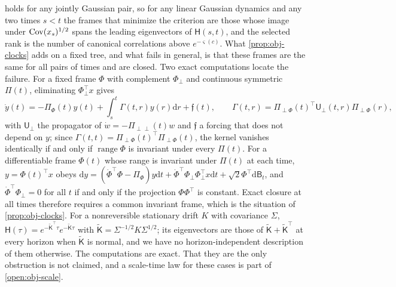 \begin{remark}\label{rem:obj-nonstationary}
 holds for any jointly Gaussian pair, so for any linear Gaussian dynamics and any two times $s<t$ the frames that minimize the criterion are those whose image under $\operatorname{Cov}(x_s)^{1/2}$ spans the leading eigenvectors of $\mathsf H(s,t)$, and the selected rank is the number of canonical correlations above $e^{-\varsigma(c)}$. What \cref{prop:obj-clocks} adds on a fixed tree, and what fails in general, is that these frames are the same for all pairs of times and are closed. Two exact computations locate the failure. For a fixed frame $\Phi$ with complement $\Phi_\perp$ and continuous symmetric $\Pi(t)$, eliminating $\Phi_\perp^\top x$ gives
\[
\dot y(t)=-\Pi_\Phi(t)y(t)+\int_s^t\Gamma(t,r)y(r)\mathrm dr+\mathfrak f(t),\qquad\Gamma(t,r)=\Pi_{\perp\Phi}(t)^\top\mathsf U_\perp(t,r)\Pi_{\perp\Phi}(r),
\]
with $\mathsf U_\perp$ the propagator of $\dot w=-\Pi_{\perp\perp}(t)w$ and $\mathfrak f$ a forcing that does not depend on $y$; since $\Gamma(t,t)=\Pi_{\perp\Phi}(t)^\top\Pi_{\perp\Phi}(t)$, the kernel vanishes identically if and only if $\operatorname{range}\Phi$ is invariant under every $\Pi(t)$. For a differentiable frame $\Phi(t)$ whose range is invariant under $\Pi(t)$ at each time, $y=\Phi(t)^\top x$ obeys $\mathrm dy=(\dot\Phi^\top\Phi-\Pi_\Phi)y\mathrm dt+\dot\Phi^\top\Phi_\perp\Phi_\perp^\top x\mathrm dt+\sqrt2\Phi^\top\mathrm d\mathsf B_t$, and $\dot\Phi^\top\Phi_\perp=0$ for all $t$ if and only if the projection $\Phi\Phi^\top$ is constant. Exact closure at all times therefore requires a common invariant frame, which is the situation of \cref{prop:obj-clocks}. For a nonreversible stationary drift $K$ with covariance $\Sigma$, $\mathsf H(\tau)=e^{-\tilde{\mathsf K}^\top\tau}e^{-\tilde{\mathsf K}\tau}$ with $\tilde{\mathsf K}=\Sigma^{-1/2}K\Sigma^{1/2}$; its eigenvectors are those of $\tilde{\mathsf K}+\tilde{\mathsf K}^\top$ at every horizon when $\tilde{\mathsf K}$ is normal, and we have no horizon-independent description of them otherwise. The computations are exact. That they are the only obstruction is not claimed, and a scale-time law for these cases is part of \cref{open:obj-scale}.
\end{remark}
